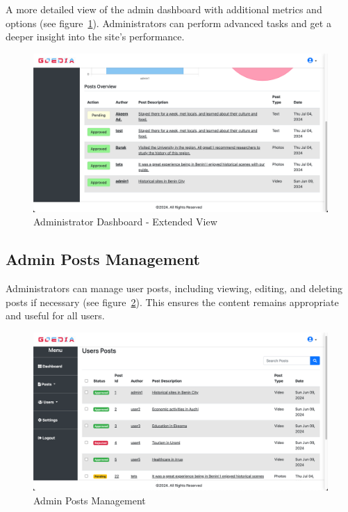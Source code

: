 A more detailed view of the admin dashboard with additional metrics and options (see figure~\ref{fig:adminDash2}). Administrators can perform advanced tasks and get a deeper insight into the site's performance.
\begin{figure}[htb]
    \centering
    \includegraphics[width=\textwidth]{adminDash2.png}
    \caption{Administrator Dashboard - Extended View}
    \label{fig:adminDash2}
\end{figure}

\subsection{Admin Posts Management}
Administrators can manage user posts, including viewing, editing, and deleting posts if necessary (see figure~\ref{fig:adminPOSTS}). This ensures the content remains appropriate and useful for all users.
\begin{figure}[htb]
    \centering
    \includegraphics[width=\textwidth]{adminPOSTS.png}
    \caption{Admin Posts Management}
    \label{fig:adminPOSTS}
\end{figure}

